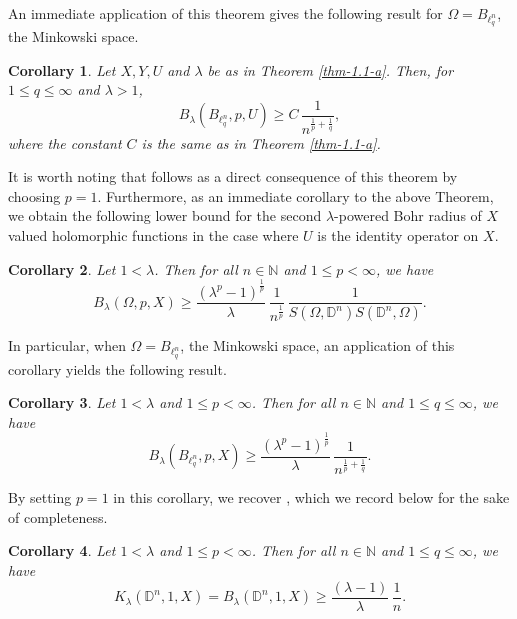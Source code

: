 \documentclass[a4paper,11pt, reqno]{amsart}
\newtheorem{cor}{Corollary}[section]
\theoremstyle{definition}
\begin{document}
An immediate application of this theorem gives the following result for $\Omega=B_{\ell^n_q}$, the Minkowski space.
\begin{cor}
Let $X,Y,U$ and $\lambda$ be as in Theorem \ref{thm-1.1-a}. Then, for $1 \leq q \leq \infty$ and $\lambda>1$,
\begin{equation*}
B_{\lambda}(B_{\ell^n_q}, p,U) \geq C\, \frac{1}{n^{\frac{1}{p}+\frac{1}{q}}},
\end{equation*}
where the constant $C$ is the same as in Theorem \ref{thm-1.1-a}.
\end{cor}
It is worth noting that \cite[Proposition 3.3]{defant-2012} follows as a direct consequence of this theorem by choosing $p=1$. Furthermore, as an immediate corollary to the above Theorem, we obtain the following lower bound for the second $\lambda$-powered Bohr radius of $X$ valued holomorphic functions in the case where $U$ is the identity operator on $X$.
\begin{cor}
	Let $1<\lambda$. Then for all $n\in \mathbb{N}$ and $1\leq p < \infty$, we have
	\begin{equation*}
		B_{\lambda}(\Omega, p,X) \geq  \frac{\left(\lambda^p -1\right)^{\frac{1}{p}}}{\lambda}\, \frac{1}{n^{\frac{1}{p}}}\,\frac{1}{S(\Omega,\mathbb{D}^n)S(\mathbb{D}^n,\Omega)}.
	\end{equation*}
\end{cor}
In particular, when $\Omega=B_{\ell^n_q}$, the Minkowski space, an application of this corollary yields the following result.
\begin{cor}
	Let $1<\lambda$ and $1\leq p < \infty$. Then for all $n\in \mathbb{N}$ and $1\leq q \leq \infty$, we have
	\begin{equation*}
		B_{\lambda}(B_{\ell^n_q}, p,X) \geq  
		\frac{\left(\lambda^p -1\right)^{\frac{1}{p}}}{\lambda}\, \frac{1}{n^{\frac{1}{p}+\frac{1}{q}}}.
	\end{equation*}
\end{cor}
By setting $p=1$ in this corollary, we recover \cite[Corollary 3.4]{defant-2012}, which we record below for the sake of completeness.
\begin{cor}
	Let $1<\lambda$ and $1\leq p < \infty$. Then for all $n\in \mathbb{N}$ and $1\leq q \leq \infty$, we have
	\begin{equation*}
	K_{\lambda}(\mathbb{D}^n, 1,X)=	B_{\lambda}(\mathbb{D}^n, 1,X) \geq  
		\frac{\left(\lambda -1\right)}{\lambda}\, \frac{1}{n}.
	\end{equation*}
\end{cor}
\end{document}
